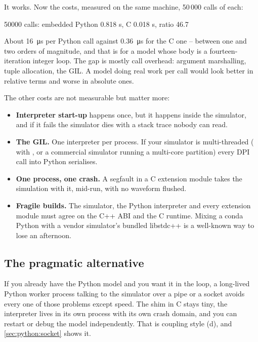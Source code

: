It works. Now the costs, measured on the same machine, 50\,000 calls of each:

\begin{txtcode}
[bench] 50000 calls: embedded Python 0.818 s, C 0.018 s, ratio 46.7
\end{txtcode}

About \SI{16}{\micro\second} per Python call against \SI{0.36}{\micro\second}
for the C one -- between one and two orders of magnitude, and that is for a
model whose body is a fourteen-iteration integer loop. The gap is mostly
call overhead: argument marshalling, tuple allocation, the GIL. A model doing
real  work per call would look better in relative terms and worse
in absolute ones.

The other costs are not measurable but matter more:

\begin{itemize}
\item \textbf{Interpreter start-up} happens once, but it happens inside the
      simulator, and if it fails the simulator dies with a stack trace nobody
      can read.
\item \textbf{The GIL.} One interpreter per process. If your simulator is
      multi-threaded ( with , or a
      commercial simulator running a multi-core partition) every DPI call
      into Python serialises.
\item \textbf{One process, one crash.} A segfault in a C extension module
      takes the simulation with it, mid-run, with no waveform flushed.
\item \textbf{Fragile builds.} The simulator, the Python interpreter and
      every extension module must agree on the C++ ABI and the C runtime.
      Mixing a conda Python with a vendor simulator's bundled libstdc++ is a
      well-known way to lose an afternoon.
\end{itemize}

\subsection{The pragmatic alternative}

If you already have the Python model and you want it in the loop, a
long-lived Python worker process talking to the simulator over a pipe or a
socket avoids every one of those problems except speed. The shim in C stays
tiny, the interpreter lives in its own process with its own crash domain, and
you can restart or debug the model independently. That is coupling style (d),
and \cref{sec:python:socket} shows it.

